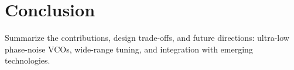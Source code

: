 \chapter{Conclusion}
Summarize the contributions, design trade-offs, and future directions: ultra-low phase-noise VCOs, wide-range tuning, and integration with emerging technologies.


